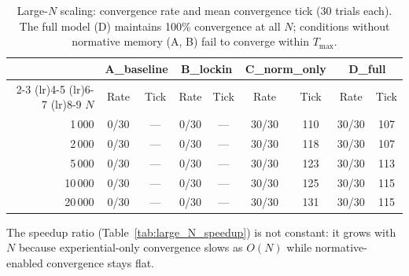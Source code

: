 \documentclass[11pt,a4paper]{article}
\begin{document}
\begin{table}[H]
\centering
\caption{Large-$N$ scaling: convergence rate and mean convergence tick (30 trials each). The full model (D) maintains 100\% convergence at all $N$; conditions without normative memory (A, B) fail to converge within $T_{\max}$.}
\label{tab:large_N_sweep}
\begin{tabular}{@{}r cc cc cc cc@{}}
\toprule
& \multicolumn{2}{c}{A\_baseline} & \multicolumn{2}{c}{B\_lockin} & \multicolumn{2}{c}{C\_norm\_only} & \multicolumn{2}{c}{D\_full} \\
\cmidrule(lr){2-3} \cmidrule(lr){4-5} \cmidrule(lr){6-7} \cmidrule(lr){8-9}
$N$ & Rate & Tick & Rate & Tick & Rate & Tick & Rate & Tick \\
\midrule
1\,000   & 0/30  & ---  & 0/30  & ---  & 30/30 & 110  & 30/30 & 107 \\
2\,000   & 0/30  & ---  & 0/30  & ---  & 30/30 & 118  & 30/30 & 107 \\
5\,000   & 0/30  & ---  & 0/30  & ---  & 30/30 & 123  & 30/30 & 113 \\
10\,000  & 0/30  & ---  & 0/30  & ---  & 30/30 & 125  & 30/30 & 115 \\
20\,000  & 0/30  & ---  & 0/30  & ---  & 30/30 & 131  & 30/30 & 115 \\
\bottomrule
\end{tabular}
\end{table}

\noindent The speedup ratio (Table~\ref{tab:large_N_speedup}) is not constant: it grows with~$N$ because experiential-only convergence slows as $O(N)$ while normative-enabled convergence stays flat.
\end{document}
